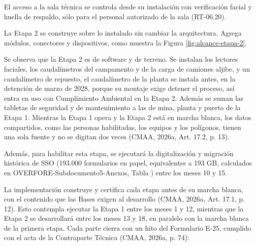 \documentclass[subdoc]{../../comun/overfore}
\begin{document}
El acceso a la sala técnica se controla desde su instalación con verificación facial y huella de respaldo, sólo para el personal autorizado de la sala (RT-06.20).

La Etapa 2 se construye sobre lo instalado sin cambiar la arquitectura. Agrega módulos, conectores y dispositivos, como muestra la Figura \ref{fig:alcance-etapa-2}.

\begin{horizontal}
\end{horizontal}
Se observa que la Etapa 2 es de software y de terreno. Se instalan los lectores faciales, los caudalímetros del campamento y de la carga de camiones aljibe, y un caudalímetro de repuesto, el caudalímetro de la planta se instala antes, en la detención de marzo de 2028, porque su montaje exige detener el proceso, así entra en uso con Cumplimiento Ambiental en la Etapa 2. Además se suman las tabletas de seguridad y de mantenimiento a las de mina, planta y puerto de la Etapa 1. Mientras la Etapa 1 opera y la Etapa 2 está en marcha blanca, los datos compartidos, como las personas habilitadas, los equipos y los polígonos, tienen una sola fuente y no se digitan dos veces (CMAA, 2026a, Art. 17.2, p. 13).

Además, para habilitar esta etapa, se ejecutará la digitalización y migración histórica de SSO (193.000 formularios en papel, equivalentes a 193 GB, calculados en OVERFORE-Subdocumento5-Anexos, Tabla ) entre los meses 10 y 15.

La implementación construye y certifica cada etapa antes de su marcha blanca, con el contenido que las Bases exigen al desarrollo (CMAA, 2026a, Art. 17.1, p. 12). Esto contempla ejecutar la Etapa 1 entre los meses 1 y 12, mientras que la Etapa 2 se desarrollará entre los meses 13 y 18, en paralelo con la marcha blanca de la primera etapa. Cada parte cierra con un hito del Formulario E-25, cumplido con el acta de la Contraparte Técnica (CMAA, 2026a, p. 74):
\end{document}
